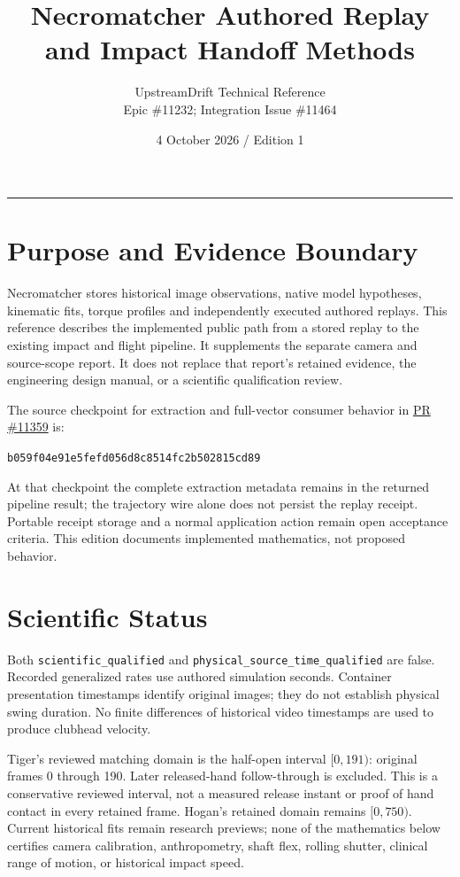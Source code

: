 \documentclass[11pt]{article}
\title{\textcolor{ink}{Necromatcher Authored Replay\\and Impact Handoff Methods}}
\author{UpstreamDrift Technical Reference\\Epic \#11232; Integration Issue \#11464}
\date{4 October 2026 / Edition 1}
\newcommand{\code}[1]{\nolinkurl{#1}}
\begin{document}
\maketitle
\begin{center}\rule{0.9\linewidth}{0.6pt}\end{center}
\section*{Purpose and Evidence Boundary}
Necromatcher stores historical image observations, native model hypotheses,
kinematic fits, torque profiles and independently executed authored replays.
This reference describes the implemented public path from a stored replay to
the existing impact and flight pipeline. It supplements the separate camera
and source-scope report. It does not replace that report's retained evidence,
the engineering design manual, or a scientific qualification review.

The source checkpoint for extraction and full-vector consumer behavior in
\href{https://github.com/D-sorganization/UpstreamDrift/pull/11359}{PR \#11359} is:
\begin{center}\small
\code{b059f04e91e5fefd056d8c8514fc2b502815cd89}
\end{center}
At that checkpoint the complete extraction metadata remains in the returned
pipeline result; the trajectory wire alone does not persist the replay receipt.
Portable receipt storage and a normal application action remain open acceptance
criteria. This edition documents implemented mathematics, not proposed behavior.

\section*{Scientific Status}
Both \code{scientific_qualified} and
\code{physical_source_time_qualified} are false. Recorded generalized rates use
authored simulation seconds. Container presentation timestamps identify original
images; they do not establish physical swing duration. No finite differences of
historical video timestamps are used to produce clubhead velocity.

Tiger's reviewed matching domain is the half-open interval $[0,191)$: original
frames 0 through 190. Later released-hand follow-through is excluded. This is a
conservative reviewed interval, not a measured release instant or proof of hand
contact in every retained frame. Hogan's retained domain remains $[0,750)$.
Current historical fits remain research previews; none of the mathematics below
certifies camera calibration, anthropometry, shaft flex, rolling shutter,
clinical range of motion, or historical impact speed.
\end{document}

